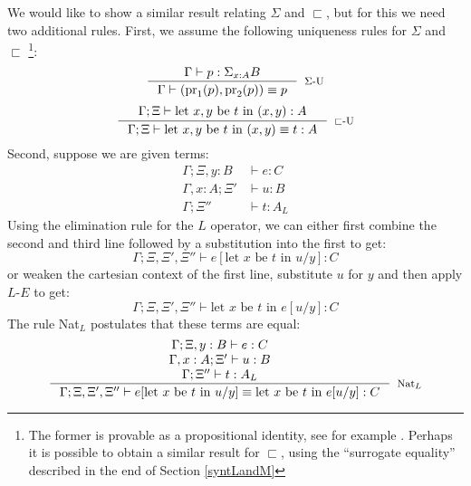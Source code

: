 \documentclass[a4paper,english]{lipics-v2018}
\begin{document}
We would like to show a similar result relating $\Sigma$ and $\sqsubset$, but for this we need two additional rules. First, we assume the following uniqueness rules for $\Sigma$ and $\sqsubset$ \footnote{The former is provable as a propositional identity, see for example \cite[Corollary~2.7.3]{hott-book}. Perhaps it is possible to obtain a similar result for $\sqsubset$, using the ``surrogate equality'' described in the end of Section \ref{syntLandM}}:
\[
  \inference{\Gamma \vdash p : \Sigma_{x : A}B}
  {\Gamma \vdash (\text{pr}_1(p), \text{pr}_2(p)) \equiv p}[$\Sigma$-U]
\]
\[
  \inference{\Gamma;\Xi \vdash \text{let $x, y$ be $t$ in $(x, y) : A$}}
  {\Gamma;\Xi \vdash \text{let $x, y$ be $t$ in $(x, y) \equiv t : A$}}[$\sqsubset$-U]
\]
Second, suppose we are given terms:
\[
  \begin{split}
    \Gamma; \Xi, y : B &\vdash e : C\\
    \Gamma, x : A; \Xi' &\vdash u : B\\
    \Gamma; \Xi'' &\vdash t : A_L
  \end{split}
\]
Using the elimination rule for the $L$ operator, we can either first combine the second and third line followed by a substitution into the first to get:
\[
  \Gamma; \Xi, \Xi', \Xi'' \vdash e[\text{let $x$ be $t$ in $u$}/y] : C
\]
or weaken the cartesian context of the first line, substitute $u$ for $y$ and then apply $L$-$E$ to get:
\[
  \Gamma; \Xi, \Xi', \Xi'' \vdash \text{let $x$ be $t$ in $e[u/y]$} : C
\]
The rule Nat$_L$ postulates that these terms are equal:
\[
  \inference{
    \Gamma; \Xi, y : B \vdash e : C\\
    \Gamma, x : A; \Xi'\vdash u : B\\
    \Gamma; \Xi'' \vdash t : A_L
}
{ \Gamma; \Xi, \Xi', \Xi'' \vdash e[\text{let $x$ be $t$ in $u$}/y] \equiv \text{let $x$ be $t$ in $e[u/y]$} : C}[Nat$_L$]
\]
\end{document}
